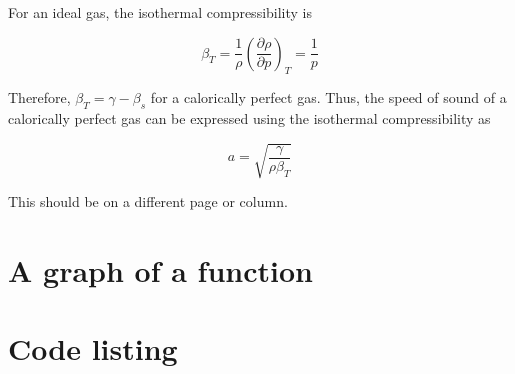 \documentclass[twocolumn]{article}
\begin{document}
For an ideal gas, the isothermal compressibility is 

\begin{equation}
    \beta_T = \frac{1}{\rho} \left(\frac{\partial \rho}{\partial p} \right)_T = \frac{1}{p}
\end{equation}

Therefore, $\beta_T = \gamma- \beta_s$ for a calorically perfect gas. Thus, the speed of sound of a calorically perfect gas can be expressed using the isothermal compressibility as 

\begin{equation}
    \boxed{a = \sqrt{\frac{\gamma}{\rho \beta_T}}}
    \end{equation}

\pagebreak

\pagebreak
{}
This should be on a different page or column.

\section{A graph of a function}

\newcommand{\E}{\mathrm{e}} 
\begin{figure}[h]
	\centering
	\caption{}
	\label{fig:my-awesome-graph}
\end{figure}

\pagebreak
\appendix
\section{Code listing}
\end{document}
